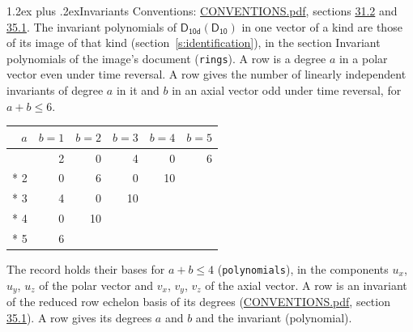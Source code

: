 \documentclass[10pt,a4paper]{article}
\makeatletter
\renewcommand\section{\@startsection{section}{1}{\z@}{-3ex plus -1ex minus -.2ex}%
  {1.2ex plus .2ex}{\normalfont\large\sffamily\bfseries\color{parttitle}}}
\numberwithin{equation}{section}
\newcommand{\grp}[1]{\mathsf{#1}}
\makeatother
\begin{document}
\section{Invariants}\label{s:invariants}
Conventions: \href{../../CONVENTIONS.pdf}{CONVENTIONS.pdf}, sections \href{../../CONVENTIONS.pdf\#conv.31.2}{31.2} and \href{../../CONVENTIONS.pdf\#conv.35.1}{35.1}.
The invariant polynomials of $\grp{D_{10d}}(\grp{D_{10}})$ in one vector of a kind are those of its image of that kind (section~\ref{s:identification}), in the section Invariant polynomials of the image's document (\texttt{rings}).
\leavevmode\label{n:index.degree.polar}\label{n:index.degree.axial}A row is a degree $a$ in a polar vector even under time reversal. A row gives the number of linearly independent invariants of degree $a$ in it and $b$ in an axial vector odd under time reversal, for $a + b \le 6$.
{\small\begin{longtable}{@{}rrrrrr@{}}\toprule
$a$ & $b = 1$ & $b = 2$ & $b = 3$ & $b = 4$ & $b = 5$\\\midrule\endhead
\bottomrule\endfoot\endlastfoot
1 & 2 & 0 & 4 & 0 & 6\\*
2 & 0 & 6 & 0 & 10 & \\*
3 & 4 & 0 & 10 &  & \\*
4 & 0 & 10 &  &  & \\*
5 & 6 &  &  &  & \\
\bottomrule\end{longtable}}
\leavevmode\label{n:local.component.polar}\label{n:local.component.axial}The record holds their bases for $a + b \le 4$ (\texttt{polynomials}), in the components $u_{x}$, $u_{y}$, $u_{z}$ of the polar vector and $v_{x}$, $v_{y}$, $v_{z}$ of the axial vector. \label{n:head.polynomial}A row is an invariant of the reduced row echelon basis of its degrees (\href{../../CONVENTIONS.pdf}{CONVENTIONS.pdf}, section \href{../../CONVENTIONS.pdf\#conv.35.1}{35.1}). A row gives its degrees $a$ and $b$ and the invariant (polynomial).
\end{document}
